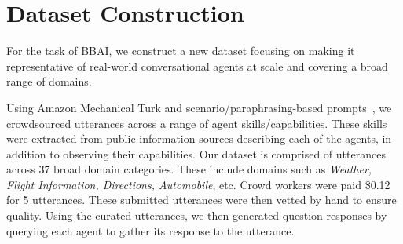 \documentclass[11pt]{article}
\begin{document}
\begin{table*}[]
\small
\centering
{}
\caption{Sample question agent responses from the One For All dataset. Responses highlighted in {\color[HTML]{008000}green} represent agent responses voted as correct by crowd workers.  }
\label{tab:data}
\vspace{-.5cm}
\end{table*}



\section{Dataset Construction} \label{sec:data}

For the task of BBAI, we construct a new dataset focusing on making it representative of real-world conversational agents at scale and covering a broad range of domains. 


Using Amazon Mechanical Turk and scenario/paraphrasing-based prompts~\cite{Kang:2018, larson}, we crowdsourced utterances across a range of agent skills/capabilities. These skills were extracted from public information sources describing each of the agents, in addition to observing their capabilities. Our dataset is comprised of utterances across 37 broad domain categories. These include domains such as \textit{Weather, Flight Information, Directions, Automobile}, etc. Crowd workers were paid \$0.12 for 5 utterances. These submitted utterances were then vetted by hand to ensure quality. Using the curated utterances, we then generated question responses by querying each agent to gather its response to the utterance. 
\end{document}
